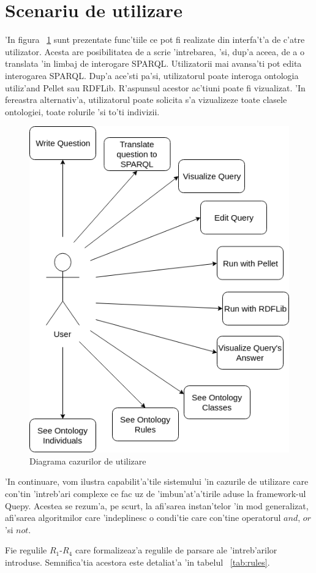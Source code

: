 \documentclass[12pt,a4paper,twoside]{report}
\begin{document}
\section{Scenariu de utilizare}

'In figura ~\ref{fig:usecases} sunt prezentate func'tiile ce pot fi realizate din interfa't'a de c'atre utilizator. Acesta are posibilitatea de a scrie 'intrebarea, 'si, dup'a aceea, de a o translata 'in limbaj de interogare SPARQL. Utilizatorii mai avansa'ti pot edita interogarea SPARQL. Dup'a ace'sti pa'si, utilizatorul poate interoga ontologia utiliz'and Pellet sau RDFLib.  R'aspunsul acestor ac'tiuni poate fi vizualizat. 'In fereastra alternativ'a, utilizatorul poate solicita s'a vizualizeze toate clasele ontologiei, toate rolurile 'si to'ti indivizii.


\begin{figure}
    \centering
    \includegraphics[width = 0.45 \linewidth]{img/use_case.png}
        \caption{Diagrama cazurilor de utilizare}
    \label{fig:usecases}
\end{figure}

'In continuare, vom ilustra capabilit'a'tile sistemului 'in cazurile de utilizare care con'tin 'intreb'ari complexe ce fac uz de 'imbun'at'a'tirile aduse la framework-ul Quepy. Acestea se rezum'a, pe scurt, la afi'sarea instan'telor 'in mod generalizat, afi'sarea algoritmilor care 'indeplinesc o condi'tie care con'tine operatorul $and$, $or$ 'si $not$.

Fie regulile $R_1$-$R_4$ care formalizeaz'a regulile de parsare ale 'intreb'arilor introduse. Semnifica'tia acestora este detaliat'a 'in tabelul ~\ref{tab:rules}.
\end{document}

